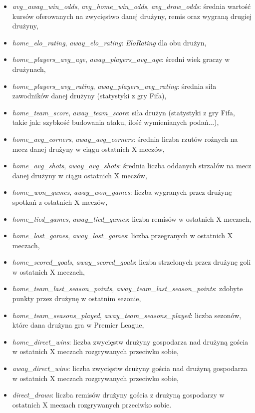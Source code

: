         \begin{itemize}
            \item \emph{avg\_away\_win\_odds}, \emph{avg\_home\_win\_odds}, \emph{avg\_draw\_odds}: średnia wartość kursów oferowanych na zwycięstwo danej drużyny, remis oraz wygraną drugiej drużyny,
            \item \emph{home\_elo\_rating}, \emph{away\_elo\_rating}: \emph{EloRating} dla obu drużyn,
            \item \emph{home\_players\_avg\_age}, \emph{away\_players\_avg\_age}: średni wiek graczy w drużynach, 
            \item \emph{home\_players\_avg\_rating}, \emph{away\_players\_avg\_rating}: średnia siła zawodników danej drużyny (statystyki z gry Fifa), 
            \item \emph{home\_team\_score}, \emph{away\_team\_score}: siła drużyn (statystyki z gry Fifa, takie jak: szybkość budowania ataku, ilość wymienianych podań...), 
            \item \emph{home\_avg\_corners}, \emph{away\_avg\_corners}: średnia liczba rzutów rożnych na mecz danej drużyny w ciągu ostatnich X meczów, 
            \item \emph{home\_avg\_shots}, \emph{away\_avg\_shots}: średnia liczba oddanych strzałów na mecz danej drużyny w ciągu ostatnich X meczów, 
            \item \emph{home\_won\_games}, \emph{away\_won\_games}: liczba wygranych przez drużynę spotkań z ostatnich X meczów, 
            \item \emph{home\_tied\_games}, \emph{away\_tied\_games}: liczba remisów w ostatnich X meczach, 
            \item \emph{home\_lost\_games}, \emph{away\_lost\_games}: liczba przegranych w ostatnich X meczach, 
            \item \emph{home\_scored\_goals}, \emph{away\_scored\_goals}: liczba strzelonych przez drużynę goli w ostatnich X meczach, 
            \item \emph{home\_team\_last\_season\_points}, \emph{away\_team\_last\_season\_points}: zdobyte punkty przez drużynę w ostatnim sezonie, 
            \item \emph{home\_team\_seasons\_played}, \emph{away\_team\_seasons\_played}: liczba sezonów, które dana drużyna gra w Premier League, 
            \item \emph{home\_direct\_wins}: liczba zwycięstw drużyny gospodarza nad drużyną gościa w ostatnich X meczach rozgrywanych przeciwko sobie,
            \item \emph{away\_direct\_wins}: liczba zwycięstw drużyny gościa nad drużyną gospodarza w ostatnich X meczach rozgrywanych przeciwko sobie, 
            \item \emph{direct\_draws}: liczba remisów drużyny gościa z drużyną gospodarzy w ostatnich X meczach rozgrywanych przeciwko sobie. 
        \end{itemize}   
        
